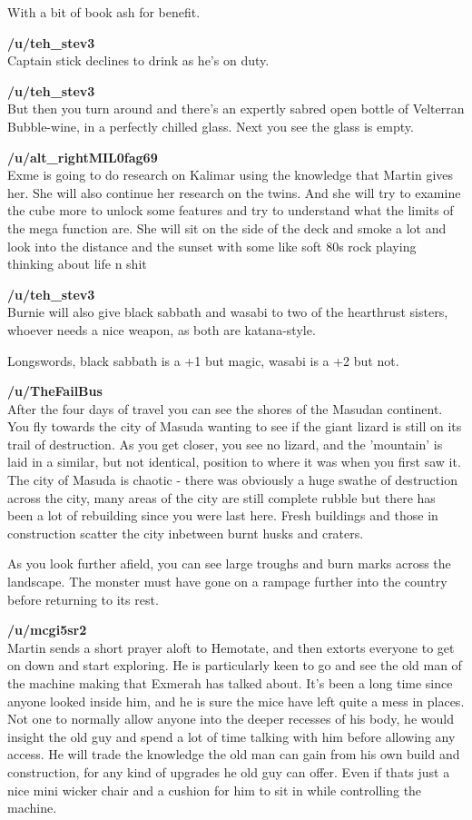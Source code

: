 With a bit of book ash for benefit.\medskip

\textbf{/u/teh\_stev3}\\
Captain stick declines to drink as he's on duty.\medskip

\textbf{/u/teh\_stev3}\\
But then you turn around and there's an expertly sabred open bottle of Velterran Bubble-wine, in a perfectly chilled glass. Next you see the glass is empty.\medskip

\textbf{/u/alt\_rightMIL0fag69}\\
Exme is going to do research on Kalimar using the knowledge that Martin gives her. She will also continue her research on the twins. And she will try to examine the cube more to unlock some features and try to understand what the limits of the mega function are. She will sit on the side of the deck and smoke a lot and look into the distance and the sunset with some like soft 80s rock playing thinking about life n shit\medskip

\textbf{/u/teh\_stev3}\\
Burnie will also give black sabbath and wasabi to two of the hearthrust sisters, whoever needs a nice weapon, as both are katana-style.\medskip

Longswords, black sabbath is a +1 but magic, wasabi is a +2 but not.\medskip

\textbf{/u/TheFailBus}\\
After the four days of travel you can see the shores of the Masudan continent. You fly towards the city of Masuda wanting to see if the giant lizard is still on its trail of destruction. As you get closer, you see no lizard, and the 'mountain' is laid in a similar, but not identical, position to where it was when you first saw it. The city of Masuda is chaotic - there was obviously a huge swathe of destruction across the city, many areas of the city are still complete rubble but there has been a lot of rebuilding since you were last here. Fresh buildings and those in construction scatter the city inbetween burnt husks and craters.\medskip

As you look further afield, you can see large troughs and burn marks across the landscape. The monster must have gone on a rampage further into the country before returning to its rest.\medskip

\textbf{/u/mcgi5sr2}\\
Martin sends a short prayer aloft to Hemotate, and then extorts everyone to get on down and start exploring. He is particularly keen to go and see the old man of the machine making that Exmerah has talked about. It's been a long time since anyone looked inside him, and he is sure the mice have left quite a mess in places. Not one to normally allow anyone into the deeper recesses of his body, he would insight the old guy and spend a lot of time talking with him before allowing any access. He will trade the knowledge the old man can gain from his own build and construction, for any kind of upgrades he old guy can offer. Even if thats just a nice mini wicker chair and a cushion for him to sit in while controlling the machine.\medskip

